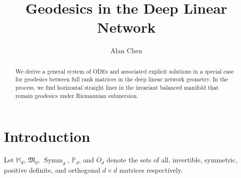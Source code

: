 \documentclass{amsart}
\DeclareMathOperator{\Symm}{Symm}
\theoremstyle{definition}
\theoremstyle{remark}
\numberwithin{equation}{section}
\begin{document}
\title[Geodesics in the DLN]{Geodesics in the Deep Linear Network}


\author{Alan Chen}
\address{Division of Applied Mathematics, Brown University, Providence, RI 02912}





\begin{abstract}
We derive a general system of ODEs and associated explicit solutions in a special case for geodesics between full rank matrices in the deep linear network geometry. In the process, we find horizontal straight lines in the invariant balanced manifold that remain geodesics under Riemannian submersion.
\end{abstract}

\maketitle

\section{Introduction}
Let $\mathbb{M}_d$, $\mathfrak{M}_d$, $\Symm_d$, $\mathbb{P}_d$, and $O_d$ denote the sets of all, invertible, symmetric, positive definite, and orthogonal $d \times d$ matrices respectively.
\end{document}
